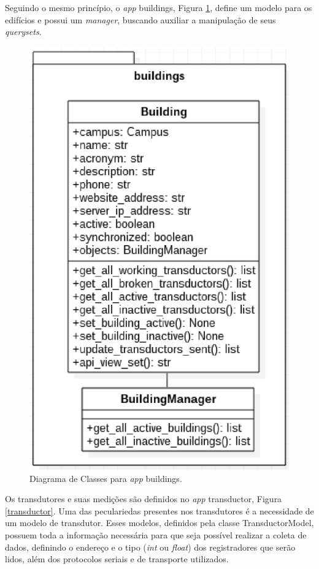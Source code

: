 Seguindo o mesmo princípio, o \textit{app} buildings, Figura \ref{buildings}, define um modelo para os edifícios e possui um \textit{manager}, buscando auxiliar a manipulação de seus \textit{querysets}.

\begin{figure}[!h]
    \centering
    \includegraphics[keepaspectratio=true,scale=0.8]{figuras/buildings.eps}
    \caption{Diagrama de Classes para \textit{app} buildings.}
    \label{buildings}
\end{figure}

Os transdutores e suas medições são definidos no \textit{app} transductor, Figura \ref{transductor}. Uma das peculariedas presentes nos transdutores é a necessidade de um modelo de transdutor. Esses modelos, definidos pela classe TransductorModel, possuem toda a informação necessária para que seja possível realizar a coleta de dados, definindo o endereço e o tipo (\textit{int} ou \textit{float}) dos registradores que serão lidos, além dos protocolos seriais e de transporte utilizados.

